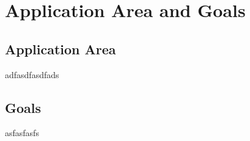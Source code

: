 \chapter{Application Area and Goals}

\section{Application Area}

adfasdfasdfads


\section{Goals}

asfasfasfs